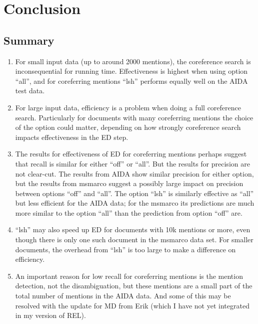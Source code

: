 \documentclass[a4paper,11pt]{article}
\numberwithin{equation}{section} %
\begin{document}
\section{Conclusion}

\subsection{Summary}
\begin{enumerate}
 \item For small input data (up to around 2000 mentions), the coreference search is inconsequential for running time. Effectiveness is highest when using option ``all'', and for coreferring mentions ``lsh'' performs equally well on the AIDA test data.
 \item For large input data, efficiency is a problem when doing a full coreference search. Particularly for documents with many coreferring mentions the choice of the option could matter, depending on how strongly coreference search impacts effectiveness in the ED step. 
 \item The results for effectiveness of ED for coreferring mentions perhaps suggest that recall is similar for either ``off'' or ``all''. But the results for precision are not clear-cut. The results from AIDA show similar precision for either option, but the results from msmarco suggest a possibly large impact on precision between options ``off'' and ``all''. 
 The option ``lsh'' is similarly effective as ``all'' but less efficient for the AIDA data; for the msmarco its predictions are much more similar to the option ``all'' than the prediction from option ``off'' are. 
 \item ``lsh'' may also speed up ED for documents with 10k mentions or more, even though there is only one such document in the msmarco data set. For smaller documents, the overhead from ``lsh'' is too large to make a difference on efficiency.  
 \item An important reason for low recall for coreferring mentions is the mention detection, not the disambiguation, but these mentions are a small part of the total number of mentions in the AIDA data. And some of this may be resolved with the update for MD from Erik (which I have not yet integrated in my version of REL).
\end{enumerate}
\end{document}
